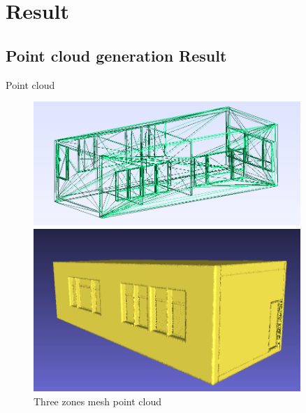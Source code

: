 \documentclass[10pt]{beamer}
\begin{document}
\section{Result}
\subsection{Point cloud generation Result}
\begin{frame}{Point cloud}
    \begin{figure}
        \begin{minipage}{0.45\textwidth}
            \centering
            \includegraphics[width=0.9\textwidth]{../image/3zones_stl.png}
        \end{minipage}%
        \begin{minipage}{0.45\textwidth}
            \centering
            \includegraphics[width=0.9\textwidth]{../image/3zones_ply.png}
        \end{minipage}
        \caption{Three zones mesh point cloud}
    \end{figure}
\end{frame}
\end{document}

